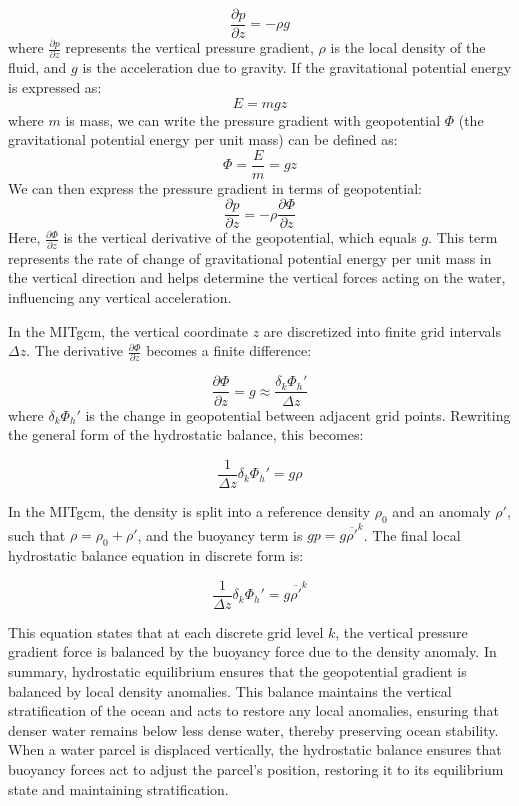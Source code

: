 \documentclass[draft]{agujournal2019}
\begin{document}
\[
\frac{\partial p}{\partial z} = -\rho g
\]
where $\frac{\partial p}{\partial z}$ represents the vertical pressure gradient, $\rho$ is the local density of the fluid, and $g$ is the acceleration due to gravity. If the gravitational potential energy is expressed as:
$$
E = m g z
$$
where $m$ is mass, we can write the pressure gradient with geopotential $\Phi$ (the gravitational potential energy per unit mass) can be defined as:
$$
\Phi = \frac{E}{m} = gz
$$
We can then express the pressure gradient in terms of geopotential:
\[
\frac{\partial p}{\partial z} = -\rho \frac{\partial \Phi}{\partial z}
\]
Here, $\frac{\partial \Phi}{\partial z}$ is the vertical derivative of the geopotential, which equals $g$. This term represents the rate of change of gravitational potential energy per unit mass in the vertical direction and helps determine the vertical forces acting on the water, influencing any  vertical acceleration.

In the MITgcm, the vertical coordinate \(z\) are discretized into finite grid intervals \(\Delta z\). The derivative \(\frac{\partial \Phi}{\partial z}\) becomes a finite difference:

\[
\frac{\partial \Phi}{\partial z} = g \approx \frac{\delta_k \Phi_h'}{\Delta z}
\]
where $\delta_k \Phi_h'$ is the change in geopotential between adjacent grid points. Rewriting the general form of the hydrostatic balance, this becomes:


\[
\frac{1}{\Delta z} \delta_k \Phi_h' = g \rho
\]

In the MITgcm, the density is split into a reference density \(\rho_0\) and an anomaly \(\rho'\), such that \(\rho = \rho_0 + \rho'\), and the buoyancy term is $gp = g \overline{\rho'}^k$. The final local hydrostatic balance equation in discrete form is:

\[
\frac{1}{\Delta z} \delta_k \Phi_h' = g \overline{\rho'}^k
\]

This equation states that at each discrete grid level \(k\), the vertical pressure gradient force is balanced by the buoyancy force due to the density anomaly. In summary, hydrostatic equilibrium ensures that the geopotential gradient is balanced by local density anomalies. This balance maintains the vertical stratification of the ocean and acts to restore any local anomalies, ensuring that denser water remains below less dense water, thereby preserving ocean stability. When a water parcel is displaced vertically, the hydrostatic balance ensures that buoyancy forces act to adjust the parcel's position, restoring it to its equilibrium state and maintaining stratification.
\end{document}
